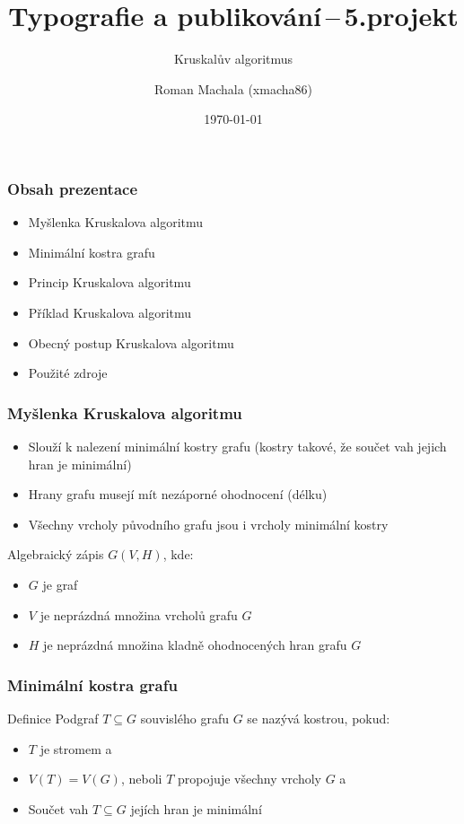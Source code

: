 \documentclass[hidelinks, 10pt, pdf, hyperref={unicode}]{beamer}
\author{Roman Machala (xmacha86)}   %
\begin{document}
\title{Typografie a publikování\,--\,5.projekt}
\subtitle{Kruskalův algoritmus}
\date{\today}
    
    \frame{\titlepage}
    \begin{frame}
        \frametitle{Obsah prezentace}
        \begin{itemize}
            \item{Myšlenka Kruskalova algoritmu} 
            \item{Minimální kostra grafu}
            \item{Princip Kruskalova algoritmu} 
            \item{Příklad Kruskalova algoritmu} 
            \item{Obecný postup Kruskalova algoritmu}
            \item{Použité zdroje}
        \end{itemize}
    \end{frame}

    \begin{frame}
        \frametitle{Myšlenka Kruskalova algoritmu}
        \begin{itemize}
            \item{Slouží k nalezení minimální kostry grafu (kostry takové, že součet vah jejich hran je minimální)}
            \item{Hrany grafu musejí mít nezáporné ohodnocení (délku)}
            \item{Všechny vrcholy původního grafu jsou i vrcholy minimální kostry}
        \end{itemize}
        \begin{block}{Algebraický zápis}
            $G(V,H)$, kde:
            \begin{itemize}
                \item{$G$ je graf}
                \item{$V$ je neprázdná množina vrcholů grafu $G$}
                \item{$H$ je neprázdná množina kladně ohodnocených hran grafu $G$}
            \end{itemize}
        \end{block}
    \end{frame}

    \begin{frame}
        \frametitle{Minimální kostra grafu}
        \begin{block}{Definice}
            Podgraf $T \subseteq G$ souvislého grafu $G$ se nazývá kostrou, pokud:
            \begin{itemize}
                \item{$T$ je stromem a}
                \item{$V(T) = V(G)$, neboli $T$ propojuje všechny vrcholy $G$ a} 
                \item{Součet vah $T \subseteq G$ jejích hran je minimální} 
            \end{itemize}  
        \end{block}
    \end{frame}
\end{document}
